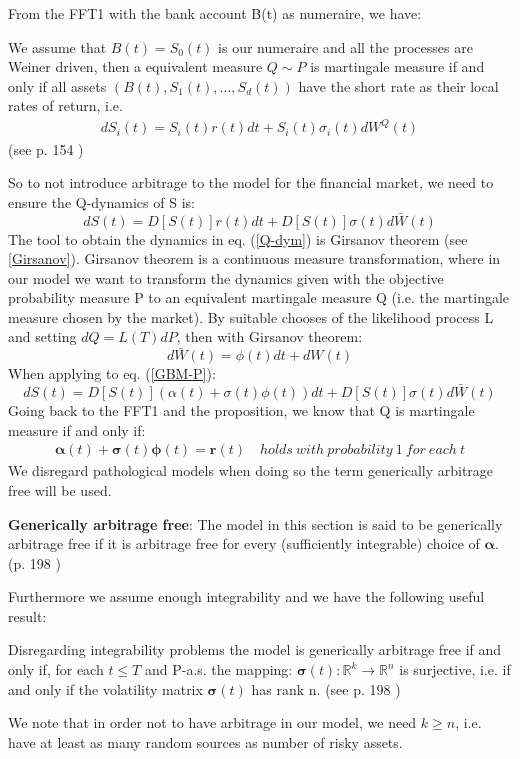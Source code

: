From the FFT1 with the bank account B(t) as numeraire, we have:
\theoremstyle{proposition}
\begin{proposition}{}
We assume that $B(t)=S_0(t)$ is our numeraire and all the processes are Weiner driven, then a equivalent measure $Q \sim P$ is martingale measure if and only if all assets $(B(t), S_1(t), \ldots, S_d(t))$ have the short rate as their local rates of return, i.e.
\begin{align}
dS_i(t)=S_i(t)r(t)dt+S_i(t)\sigma_i(t)dW^Q(t)
\end{align}
(see p. 154 \parencite{finKont})
\end{proposition}
So to not introduce arbitrage to the model for the financial market, we need to ensure the Q-dynamics of S is:
\begin{equation}\label{Q-dym}
dS(t)=D[S(t)]r(t)dt+D[S(t)]\sigma(t)d\bar{W}(t)
\end{equation}
The tool to obtain the dynamics in eq. (\ref{Q-dym}) is Girsanov theorem (see \ref{Girsanov}). Girsanov theorem is a continuous measure transformation, where in our model we want to transform the dynamics given with the objective probability measure P to an equivalent martingale measure Q (i.e. the martingale measure chosen by the market). By suitable chooses of the likelihood process L and setting $dQ=L(T)dP$, then with Girsanov theorem:
$$d\bar{W}(t)=\phi(t)dt + dW(t)$$
When applying to eq. (\ref{GBM-P}):
$$dS(t)=D[S(t)](\alpha(t)+\sigma(t)\phi(t))dt+D[S(t)]\sigma(t)d\bar{W}(t)$$
Going back to the FFT1 and the proposition, we know that Q is martingale measure if and only if:
\begin{align}\label{marketPriceOfRisk}
\bm{\alpha}(t)+\bm{\sigma}(t)\bm{\phi}(t)=\textbf{r}(t) \quad holds \ with \ probability \ 1 \ for \ each \ t
\end{align}
We disregard pathological models when doing so the term generically arbitrage free will be used. 

\theoremstyle{definition}
\begin{definition}{\textbf{Generically arbitrage free}:}
The model in this section is said to be generically arbitrage free if it is arbitrage free for every (sufficiently integrable) choice of $\bm{\alpha}$.
(p. 198 \parencite{finKont})
\end{definition}

Furthermore we assume enough integrability and we have the following useful result:
\theoremstyle{proposition}
\begin{proposition}{}\label{arbitrageFreeProp}
Disregarding integrability problems the model is generically arbitrage free if and only if, for each $t\leq T$ and P-a.s. the mapping:
$\bm{\sigma}(t):\mathbb{R}^k \to \mathbb{R}^n$ is surjective, i.e. if and only if the volatility matrix $\bm{\sigma}(t)$ has rank n.
(see p. 198 \parencite{finKont})
\end{proposition}
We note that in order not to have arbitrage in our model, we need $k\geq n$, i.e. have at least as many random sources as number of risky assets.

